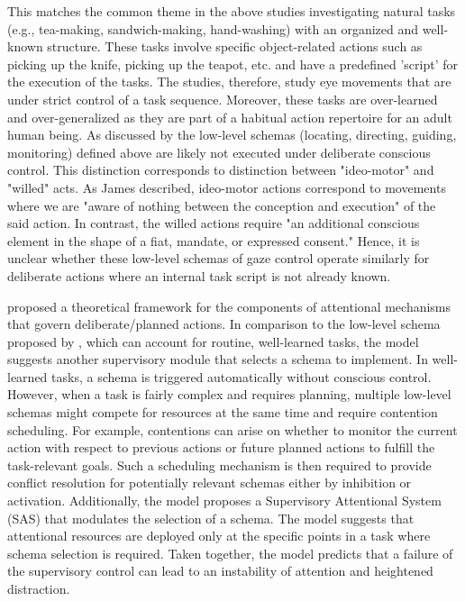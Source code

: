 This matches the common theme in the above studies investigating natural tasks (e.g., tea-making, sandwich-making, hand-washing) with an organized and well-known structure. These tasks involve specific object-related actions such as picking up the knife, picking up the teapot, etc. and have a predefined ’script’ for the execution of the tasks. The studies, therefore, study eye movements that are under strict control of a task sequence. Moreover, these tasks are over-learned and over-generalized as they are part of a habitual action repertoire for an adult human being. As discussed by \citet{Land2006-da} the low-level schemas (locating, directing, guiding, monitoring) defined above are likely not executed under deliberate conscious control. This distinction corresponds to \citet{James2007-zv} distinction between "ideo-motor" and "willed" acts. As James described, ideo-motor actions correspond to movements where we are "aware of nothing between the conception and execution" of the said action. In contrast, the willed actions require "an additional conscious element in the shape of a fiat, mandate, or expressed consent." Hence, it is unclear whether these low-level schemas of gaze control operate similarly for deliberate actions where an internal task script is not already known.

\citet{Norman1986-qb} proposed a theoretical framework for the components of attentional mechanisms that govern deliberate/planned actions. In comparison to the low-level schema proposed by \citet{Land2006-da}, which can account for routine, well-learned tasks, the \citet{Norman1986-qb} model suggests another supervisory module that selects a schema to implement. In well-learned tasks, a schema is triggered automatically without conscious control. However, when a task is fairly complex and requires planning, multiple low-level schemas might compete for resources at the same time and require contention scheduling. For example, contentions can arise on whether to monitor the current action with respect to previous actions or future planned actions to fulfill the task-relevant goals. Such a scheduling mechanism is then required to provide conflict resolution for potentially relevant schemas either by inhibition or activation. Additionally, the model proposes a Supervisory Attentional System (SAS) that modulates the selection of a schema. The model suggests that attentional resources are deployed only at the specific points in a task where schema selection is required. Taken together, the model predicts that a failure of the supervisory control can lead to an instability of attention and heightened distraction.

